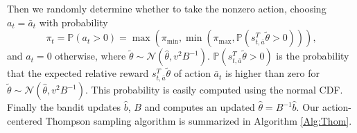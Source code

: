 \documentclass{article}
\begin{document}
Then we randomly determine whether to take the nonzero action, choosing $a_t =\bar{a}_t$ with probability
\begin{equation}
\label{eq:nzprob}
\pi_t = \mathbb{P}(a_t > 0) = \max(\pi_{\min},\min(\pi_{\max},\mathbb{P}(s_{t,\bar{a}}^T \tilde{\theta}> 0))),
\end{equation}
and $a_t = 0$ otherwise, where $\tilde{\theta} \sim\mathcal{N}(\hat{\theta},v^2 B^{-1})$. $\mathbb{P}(s_{t,\bar{a}}^T \tilde{\theta}> 0)$ is the probability that the expected relative reward $s_{t,\bar{a}}^T \tilde{\theta}$ of action $\bar{a}_t$ is higher than zero for $\tilde{\theta} \sim\mathcal{N}(\hat{\theta},v^2 B^{-1})$.
This probability is easily computed using the normal CDF. 
 Finally the bandit updates $\hat b$, $B$ and computes an updated $\hat{\theta} = B^{-1} \hat{b}$.
 Our action-centered Thompson sampling algorithm is summarized in Algorithm \ref{Alg:Thom}.
 
 
 
\end{document}
